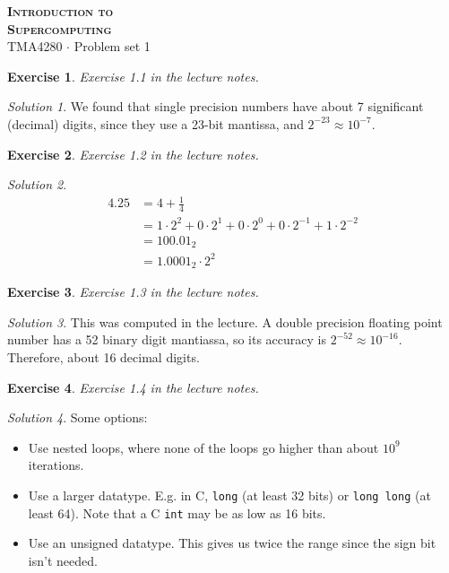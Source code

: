 \documentclass[onecolumn, oneside, a4paper, 11pt]{memoir}
\newtheorem{ex}{Exercise}
\theoremstyle{remark}
\newtheorem*{sol}{Solution}
\begin{document}
\pagestyle{empty}

\begin{center}
  {\Huge \bfseries \scshape
    Introduction to \\[0.2\baselineskip] Supercomputing} \\[2\baselineskip]
  {\Large TMA4280 $\cdot$ Problem set 1} \\[2\baselineskip]
\end{center}

\begin{ex}
  Exercise 1.1 in the lecture notes.
\end{ex}
\begin{sol}
  We found that single precision numbers have about 7 significant (decimal)
  digits, since they use a 23-bit mantissa, and $2^{-23} \approx 10^{-7}$.
\end{sol}

\begin{ex}
  Exercise 1.2 in the lecture notes.
\end{ex}
\begin{sol}
  \begin{align*}
    4.25 &= 4 + \frac{1}{4} \\
         &= 1 \cdot 2^2 + 0 \cdot 2^1 + 0 \cdot 2^0 + 0 \cdot 2^{-1} + 1 \cdot 2^{-2} \\
         &= 100.01_2 \\
         &= 1.0001_2 \cdot 2^2
  \end{align*}
\end{sol}

\begin{ex}
  Exercise 1.3 in the lecture notes.
\end{ex}
\begin{sol}
  This was computed in the lecture. A double precision floating point number has
  a 52 binary digit mantiassa, so its accuracy is $2^{-52} \approx 10^{-16}$.
  Therefore, about 16 decimal digits.
\end{sol}

\begin{ex}
  Exercise 1.4 in the lecture notes.
\end{ex}
\begin{sol}
  Some options:
  \begin{itemize}
  \item Use nested loops, where none of the loops go higher than about $10^9$
    iterations.
  \item Use a larger datatype. E.g. in C, \texttt{long} (at least 32 bits) or
    \texttt{long long} (at least 64). Note that a C \texttt{int} may be as low
    as 16 bits.
  \item Use an unsigned datatype. This gives us twice the range since the sign
    bit isn't needed.
  \end{itemize}
\end{sol}
\end{document}
